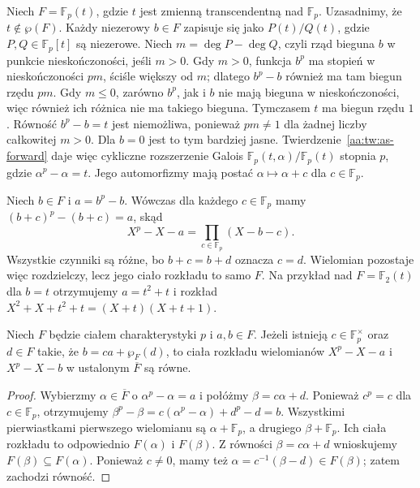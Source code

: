 \begin{przyklad}\label{aa:prz:as-rational}
Niech $F=\mathbb F_p(t)$, gdzie $t$ jest zmienną
transcendentną nad $\mathbb F_p$. Uzasadnimy, że
$t\notin\wp(F)$. Każdy niezerowy $b\in F$ zapisuje się
jako $P(t)/Q(t)$, gdzie $P,Q\in\mathbb F_p[t]$ są niezerowe.
Niech $m=\deg P-\deg Q$, czyli rząd bieguna
$b$ w punkcie nieskończoności, jeśli $m>0$.
Gdy $m>0$, funkcja $b^p$ ma stopień w nieskończoności $pm$,
ściśle większy od $m$; dlatego $b^p-b$ również ma tam
biegun rzędu $pm$. Gdy $m\le0$, zarówno $b^p$, jak i $b$
nie mają bieguna w nieskończoności, więc również ich różnica
nie ma takiego bieguna. Tymczasem $t$ ma biegun rzędu $1$.
Równość $b^p-b=t$ jest niemożliwa, ponieważ $pm\ne1$
dla żadnej liczby całkowitej $m>0$. Dla $b=0$ jest to
tym bardziej jasne. Twierdzenie~\ref{aa:tw:as-forward}
daje więc cykliczne rozszerzenie Galois
$\mathbb F_p(t,\alpha)/\mathbb F_p(t)$ stopnia $p$, gdzie
$\alpha^p-\alpha=t$. Jego automorfizmy mają postać
$\alpha\mapsto\alpha+c$ dla $c\in\mathbb F_p$.
\end{przyklad}

\begin{przyklad}\label{aa:prz:as-trivial}
Niech $b\in F$ i $a=b^p-b$. Wówczas dla każdego
$c\in\mathbb F_p$ mamy $(b+c)^p-(b+c)=a$, skąd
\[
X^p-X-a=\prod_{c\in\mathbb F_p}(X-b-c).
\]
Wszystkie czynniki są różne, bo $b+c=b+d$ oznacza $c=d$.
Wielomian pozostaje więc rozdzielczy, lecz jego ciało rozkładu
to samo $F$. Na przykład nad $F=\mathbb F_2(t)$ dla
$b=t$ otrzymujemy $a=t^2+t$ i rozkład
$X^2+X+t^2+t=(X+t)(X+t+1)$.
\end{przyklad}

\begin{stwierdzenie}\label{aa:prop:as-classes}
Niech $F$ będzie ciałem charakterystyki $p$ i $a,b\in F$.
Jeżeli istnieją $c\in\mathbb F_p^\times$ oraz $d\in F$
takie, że $b=ca+\wp_F(d)$, to ciała rozkładu wielomianów
$X^p-X-a$ i $X^p-X-b$ w ustalonym $\overline F$ są równe.
\end{stwierdzenie}
\begin{proof}
Wybierzmy $\alpha\in\overline F$ o
$\alpha^p-\alpha=a$ i połóżmy $\beta=c\alpha+d$.
Ponieważ $c^p=c$ dla $c\in\mathbb F_p$, otrzymujemy
$\beta^p-\beta=c(\alpha^p-\alpha)+d^p-d=b$.
Wszystkimi pierwiastkami pierwszego wielomianu są
$\alpha+\mathbb F_p$, a drugiego $\beta+\mathbb F_p$.
Ich ciała rozkładu to odpowiednio $F(\alpha)$ i
$F(\beta)$. Z równości $\beta=c\alpha+d$ wnioskujemy
$F(\beta)\subseteq F(\alpha)$. Ponieważ $c\ne0$,
mamy też $\alpha=c^{-1}(\beta-d)\in F(\beta)$;
zatem zachodzi równość.
\end{proof}

